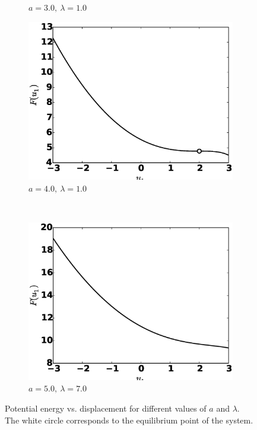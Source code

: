 \documentclass[14pt, a4paper]{extreport}
\begin{document}
\begin{figure}[H]
\begin{subfigure}[h]{8.0 cm}
		\caption{$a=3.0,\ \lambda = 1.0$}
	\end{subfigure}
	\begin{subfigure}[h]{8.0 cm}
        \includegraphics[width=8.0 cm]{figure/a40_lambda40.eps}
		\caption{$a=4.0,\ \lambda = 1.0$}
    \end{subfigure}
    \\
    	\begin{subfigure}[h]{8.0 cm}
        \includegraphics[width=8.0 cm]{figure/a50_lambda70.eps}
		\caption{$a=5.0,\ \lambda = 7.0$}
    \end{subfigure}
    \caption{Potential energy vs. displacement for different values of $a$ and $\lambda$. The white circle corresponds to the equilibrium point of the system.}
    \label{fig:potentialFunction}
\end{figure}
%
%
\end{document}
